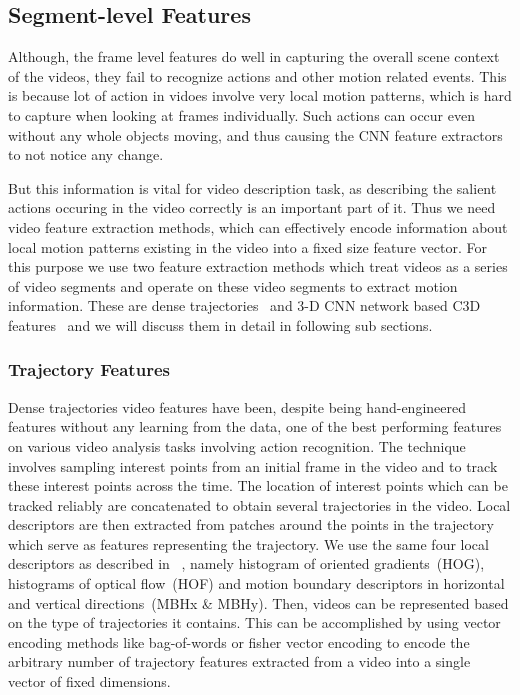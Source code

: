 \subsection{Segment-level Features}
Although, the frame level features do well in capturing the overall scene
context of the videos, they fail to recognize actions and other motion related
events.
This is because lot of action in vidoes involve very local motion patterns,
which is hard to capture when looking at frames individually.
Such actions can occur even without any whole objects moving, and thus causing
the CNN feature extractors to not notice any change.

But this information is vital for video description task, as describing the
salient actions occuring in the video correctly is an important part of it.
Thus we need video feature extraction methods, which can effectively encode
information about local motion patterns existing in the video into a fixed size
feature vector.
For this purpose we use two feature extraction methods which treat videos as a
series of video segments and operate on these video segments to extract motion
information.
These are dense trajectories~\cite{DBLP:conf/cvpr/WangKSL11, Wang2013} and 3-D CNN
network based C3D features~\cite{DBLP:C3D} and we will discuss them in detail in
following sub sections.

\subsubsection{Trajectory Features}

Dense trajectories video features have been, despite being hand-engineered
features without any learning from the data, one of the best performing features
on various video analysis tasks involving action recognition.
The technique involves sampling interest points from an initial frame in the
video and to track these interest points across the time.
The location of interest points which can be tracked reliably are concatenated
to obtain several trajectories in the video.
Local descriptors are then extracted from patches around the points in the
trajectory which serve as features representing the trajectory.
We use the same four local descriptors as described in
~\cite{DBLP:conf/cvpr/WangKSL11, Wang2013}, namely histogram of oriented
gradients~(HOG), histograms of optical flow~(HOF) and motion boundary
descriptors in horizontal and vertical directions~(MBHx \& MBHy).
Then, videos can be represented based on the type of trajectories it contains.
This can be accomplished by using vector encoding methods like bag-of-words or
fisher vector encoding to encode the arbitrary number of trajectory features
extracted from a video into a single vector of fixed dimensions.

